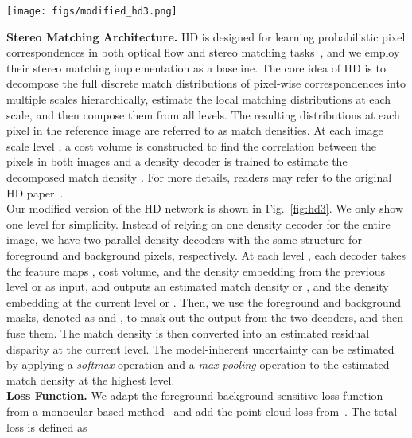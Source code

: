 \documentclass[letterpaper, 10 pt, conference]{ieeeconf}
\begin{document}
\begin{figure*}[t!]
	\begin{center}
		\texttt{[image: figs/modified\_hd3.png]}
	\end{center}
	\caption{Modified HD network at the  level. Instead of one density decoder for the entire image, we use separate density decoders for foreground pixels and background pixels, respectively, which allows us to optimize the weights specifically for each task.}
	\label{fig:hd3}
\end{figure*}

\noindent \textbf{Stereo Matching Architecture.} 
HD is designed for learning probabilistic pixel correspondences in both optical flow and stereo matching tasks~\cite{yin2019hd3}, and we employ their stereo matching implementation as a baseline. The core idea of HD is to decompose the full discrete match distributions of pixel-wise correspondences into multiple scales hierarchically, estimate the local matching distributions at each scale, and then compose them from all levels. The resulting distributions at each pixel in the reference image are referred to as match densities. At each image scale level , a cost volume is constructed to find the correlation between the pixels in both images and a density decoder is trained to estimate the decomposed match density . For more details, readers may refer to the original HD paper~\cite{yin2019hd3}.\\

Our modified version of the HD network is shown in Fig.~\ref{fig:hd3}. We only show one level for simplicity. Instead of relying on one density decoder for the entire image, we have two parallel density decoders with the same structure for foreground and background pixels, respectively. At each level , each decoder takes the feature maps , cost volume, and the density embedding from the previous
level  or  as input, and outputs an estimated match density  or , and the density embedding at the current level  or . Then, we use the foreground and background masks, denoted as  and , to mask out the output from the two decoders, and then fuse them. The match density is then converted into an estimated residual disparity  at the current level. The model-inherent uncertainty can be estimated by applying a \textit{softmax} operation and a \textit{max-pooling} operation to the estimated match density at the highest level.\\

\noindent \textbf{Loss Function.} 
We adapt the foreground-background sensitive loss function from a monocular-based method~\cite{wang2019task} and add the point cloud loss from~\cite{ku2019monocular}. The total loss is defined as
\end{document}
